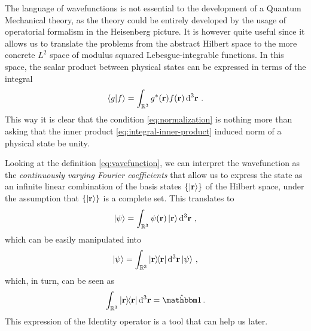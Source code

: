             The language of wavefunctions is not essential to the development of a Quantum Mechanical theory, as the theory could be entirely developed by the usage of operatorial formalism in the Heisenberg picture. It is however quite useful since it allows us to translate the problems from the abstract Hilbert space to the more concrete $L^2$ space of modulus squared Lebesgue-integrable functions. In this space, the scalar product between physical states can be expressed in terms of the integral
            \begin{equation}
                \label{eq:integral-inner-product}
                \braket{g}{f} = \int\nolimits_{\bbR^3}g^*\pqty{\vb{r}} f\pqty{\vb{r}} \dd[3]{\vb{r}}
                \myperiod
            \end{equation}
            This way it is clear that the condition \eqref{eq:normalization} is nothing more than asking that the inner product \eqref{eq:integral-inner-product} induced norm of a physical state be unity.

            Looking at the definition \eqref{eq:vavefunction}, we can interpret the wavefunction as the \emph{continuously varying Fourier coefficients} that allow us to express the state as an infinite linear combination of the basis states $\qty{\ket{\vb{r}}}$ of the Hilbert space, under the assumption that $\qty{\ket{\vb{r}}}$ is a complete set. This translates to
            \begin{equation*}
                \ket{\psi} = \int\nolimits_{\bbR^3} \psi\pqty{\vb{r}} \ket{\vb{r}} \dd[3]{\vb{r}}
                \mycomma
            \end{equation*}
            which can be easily manipulated into
            \begin{equation*}
                \ket{\psi} = \int\nolimits_{\bbR^3} \dyad{\vb{r}}{\vb{r}} \dd[3]{\vb{r}} \ket{\psi}
                \mycomma
            \end{equation*}
            which, in turn, can be seen as
            \begin{equation}
                \label{eq:integral-identity}
                \int\nolimits_{\bbR^3} \dyad{\vb{r}}{\vb{r}} \dd[3]{\vb{r}} = \hat{\idM}
                \myperiod
            \end{equation}
            This expression of the Identity operator is a tool that can help us later.
        
